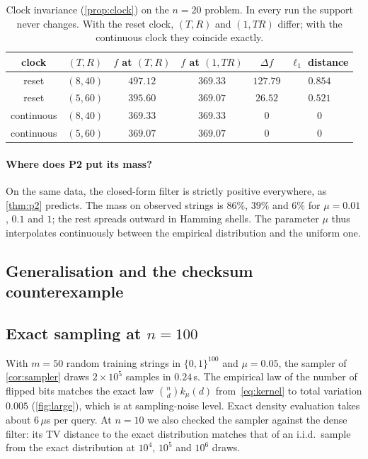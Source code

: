 \documentclass[11pt]{article}
\theoremstyle{definition}
\theoremstyle{remark}
\begin{document}
\begin{table}[t]
\centering
\caption{Clock invariance (\cref{prop:clock}) on the $n=20$ problem. In every run the support never changes. With the reset clock, $(T,R)$ and $(1,TR)$ differ; with the continuous clock they coincide exactly.}\label{tab:clock}
\begin{tabular}{cccccc}
\toprule
clock & $(T,R)$ & $f$ at $(T,R)$ & $f$ at $(1,TR)$ & $\Delta f$ & $\ell_1$ distance\\
\midrule
reset & $(8,40)$ & $497.12$ & $369.33$ & $127.79$ & $0.854$\\
reset & $(5,60)$ & $395.60$ & $369.07$ & $26.52$ & $0.521$\\
continuous & $(8,40)$ & $369.33$ & $369.33$ & $0$ & $0$\\
continuous & $(5,60)$ & $369.07$ & $369.07$ & $0$ & $0$\\
\bottomrule
\end{tabular}
\end{table}

\paragraph{Where does P2 put its mass?}
On the same data, the closed-form filter is strictly positive everywhere, as \cref{thm:p2} predicts. The mass on observed strings is $86\%$, $39\%$ and $6\%$ for $\mu=0.01$, $0.1$ and $1$; the rest spreads outward in Hamming shells. The parameter $\mu$ thus interpolates continuously between the empirical distribution and the uniform one.

\subsection{Generalisation and the checksum counterexample}\label{sec:exp-gen}



\subsection{Exact sampling at $n=100$}\label{sec:exp-large}

With $m=50$ random training strings in $\{0,1\}^{100}$ and $\mu=0.05$, the sampler of \cref{cor:sampler} draws $2\times10^5$ samples in $0.24$\,s. The empirical law of the number of flipped bits matches the exact law $\binom nd k_\mu(d)$ from~\eqref{eq:kernel} to total variation $0.005$ (\cref{fig:large}), which is at sampling-noise level. Exact density evaluation takes about $6\,\mu$s per query. At $n=10$ we also checked the sampler against the dense filter: its TV distance to the exact distribution matches that of an i.i.d.\ sample from the exact distribution at $10^4$, $10^5$ and $10^6$ draws.
\end{document}

